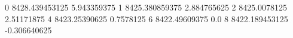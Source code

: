 0 8428.439453125 5.943359375
1 8425.380859375 2.884765625
2 8425.0078125 2.51171875
4 8423.25390625 0.7578125
6 8422.49609375 0.0
8 8422.189453125 -0.306640625
